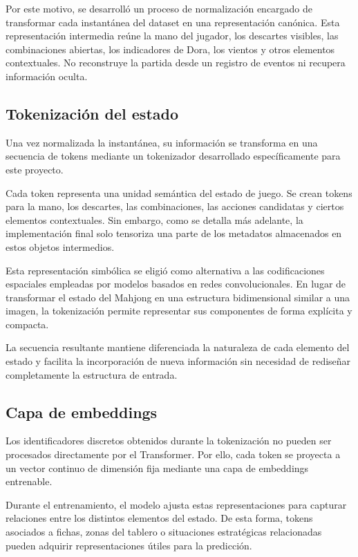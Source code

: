 Por este motivo, se desarrolló un proceso de normalización encargado de transformar cada instantánea del dataset en una representación canónica. Esta representación intermedia reúne la mano del jugador, los descartes visibles, las combinaciones abiertas, los indicadores de Dora, los vientos y otros elementos contextuales. No reconstruye la partida desde un registro de eventos ni recupera información oculta.


\subsection{Tokenización del estado}

Una vez normalizada la instantánea, su información se transforma en una secuencia de tokens mediante un tokenizador desarrollado específicamente para este proyecto.

Cada token representa una unidad semántica del estado de juego. Se crean tokens para la mano, los descartes, las combinaciones, las acciones candidatas y ciertos elementos contextuales. Sin embargo, como se detalla más adelante, la implementación final solo tensoriza una parte de los metadatos almacenados en estos objetos intermedios.

Esta representación simbólica se eligió como alternativa a las codificaciones espaciales empleadas por modelos basados en redes convolucionales. En lugar de transformar el estado del Mahjong en una estructura bidimensional similar a una imagen, la tokenización permite representar sus componentes de forma explícita y compacta.

La secuencia resultante mantiene diferenciada la naturaleza de cada elemento del estado y facilita la incorporación de nueva información sin necesidad de rediseñar completamente la estructura de entrada.

\subsection{Capa de embeddings}

Los identificadores discretos obtenidos durante la tokenización no pueden ser procesados directamente por el Transformer. Por ello, cada token se proyecta a un vector continuo de dimensión fija mediante una capa de embeddings entrenable.

Durante el entrenamiento, el modelo ajusta estas representaciones para capturar relaciones entre los distintos elementos del estado. De esta forma, tokens asociados a fichas, zonas del tablero o situaciones estratégicas relacionadas pueden adquirir representaciones útiles para la predicción.

